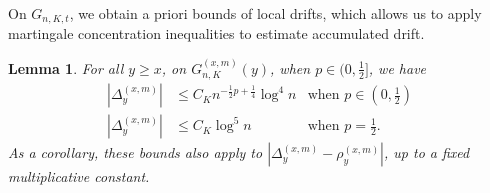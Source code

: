 \documentclass[twoside,12pt, a4paper, final]{article}
\newtheorem{lemma}{Lemma}[section]
\numberwithin{equation}{section}
\theoremstyle{remark}
\begin{document}
	On $G_{n, K, t}$, we obtain a priori bounds of local drifts, which allows us to apply martingale concentration inequalities to estimate accumulated drift.
	\begin{lemma}\label{lm:lipchitz-bound-on-good-event}
		For all  $y \ge x$, on $G_{n, K}^{(x,m)}(y)$, when $p \in (0,\frac{1}{2}]$,  we have
		\begin{align*}
			\left| \Delta_y^{(x,m)} \right| &\le C_K n^{-\frac{1}{2}p + \frac{1}{4}} \log^4 n &\text{when }p \in \left(0,\frac{1}{2}\right)\\
			\left| \Delta_y^{(x,m)} \right| &\le C_K \log^5 n &\text{when }p = \frac{1}{2}
			.\end{align*}
		As a corollary, these bounds also apply to $\left| \Delta_y^{(x,m)} - \rho_y^{(x,m)} \right| $, up to a fixed multiplicative constant.
	\end{lemma}
\end{document}
